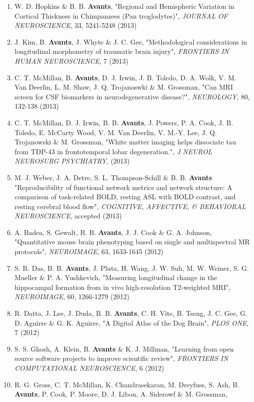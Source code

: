 \documentclass[11pt]{moderncv} %
\begin{document}
\begin{enumerate}
\item W. D. Hopkins \& B. B. \textbf{Avants}, 
"Regional and Hemispheric Variation in Cortical Thickness in Chimpanzees (Pan troglodytes)", 
{\em JOURNAL OF NEUROSCIENCE}, 33, 5241-5248 (2013)
\item J. Kim, B. \textbf{Avants}, J. Whyte \&  J. C. Gee, 
"Methodological considerations in longitudinal morphometry of traumatic brain injury", 
{\em FRONTIERS IN HUMAN NEUROSCIENCE}, 7 (2013)
\item C. T. McMillan, B. \textbf{Avants}, D. J. Irwin, J. B. Toledo, D. A. Wolk, V. M. Van Deerlin, L. M. Shaw, J. Q. Trojanoswki \&  M. Grossman, 
"Can MRI screen for CSF biomarkers in neurodegenerative disease?", 
{\em NEUROLOGY}, 80, 132-138 (2013)
\item C. T. McMillan, D. J. Irwin, B. B. \textbf{Avants}, J. Powers, P. A. Cook, J. B. Toledo, E. McCarty Wood, V. M. Van Deerlin, V. M.-Y. Lee, J. Q. Trojanowski \&  M. Grossman, 
"White matter imaging helps dissociate tau from TDP-43 in frontotemporal lobar degeneration.", 
{\em J NEUROL NEUROSURG PSYCHIATRY}, (2013)
\item M. J. Weber, J. A. Detre, S. L. Thompson-Schill \&  B. B. \textbf{Avants}
"Reproducibility of functional network metrics and network structure: A comparison of task-related BOLD, resting ASL with BOLD contrast, and resting cerebral blood flow", 
{\em COGNITIVE, AFFECTIVE, \&  BEHAVIORAL NEUROSCIENCE}, accepted (2013)
\item A. Badea, S. Gewalt, B. B. \textbf{Avants}, J. J. Cook \&  G. A. Johnson, 
"Quantitative mouse brain phenotyping based on single and multispectral MR protocols", 
{\em NEUROIMAGE}, 63, 1633-1645 (2012)
\item S. R. Das, B. B. \textbf{Avants}, J. Pluta, H. Wang, J. W. Suh, M. W. Weiner, S. G. Mueller \&  P. A. Yushkevich, 
"Measuring longitudinal change in the hippocampal formation from in vivo high-resolution T2-weighted MRI", 
{\em NEUROIMAGE}, 60, 1266-1279 (2012)
\item R. Datta, J. Lee, J. Duda, B. B. \textbf{Avants}, C. H. Vite, B. Tseng, J. C. Gee, G. D. Aguirre \&  G. K. Aguirre, 
"A Digital Atlas of the Dog Brain", 
{\em PLOS ONE}, 7 (2012)
\item S. S. Ghosh, A. Klein, B. \textbf{Avants} \&  K. J. Millman, 
"Learning from open source software projects to improve scientific review", 
{\em FRONTIERS IN COMPUTATIONAL NEUROSCIENCE}, 6 (2012)
\item R. G. Gross, C. T. McMillan, K. Chandrasekaran, M. Dreyfuss, S. Ash, B. \textbf{Avants}, P. Cook, P. Moore, D. J. Libon, A. Siderowf \&  M. Grossman, 

\end{enumerate}
\end{document}
